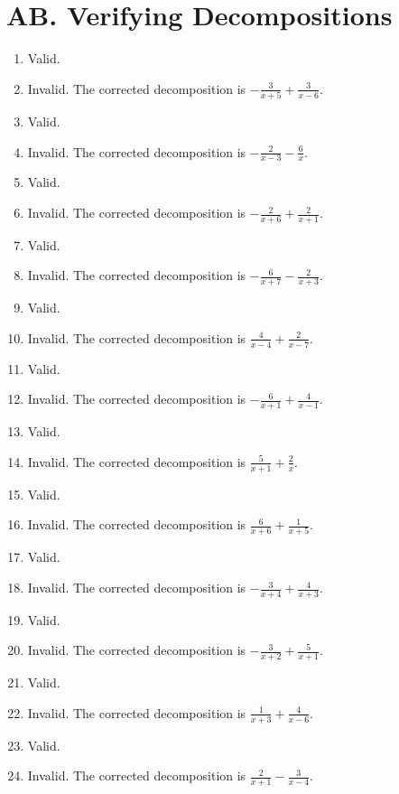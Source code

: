 \documentclass[11pt,oneside]{book}
\begin{document}
\section*{AB. Verifying Decompositions}
\begin{enumerate}[leftmargin=*,label=\textbf{AB\arabic*.},itemsep=0.45\baselineskip]
\item Valid.
\item Invalid. The corrected decomposition is $\displaystyle - \frac{3}{x + 5} + \frac{3}{x - 6}$.
\item Valid.
\item Invalid. The corrected decomposition is $\displaystyle - \frac{2}{x - 3} - \frac{6}{x}$.
\item Valid.
\item Invalid. The corrected decomposition is $\displaystyle - \frac{2}{x + 6} + \frac{2}{x + 1}$.
\item Valid.
\item Invalid. The corrected decomposition is $\displaystyle - \frac{6}{x + 7} - \frac{2}{x + 3}$.
\item Valid.
\item Invalid. The corrected decomposition is $\displaystyle \frac{4}{x - 4} + \frac{2}{x - 7}$.
\item Valid.
\item Invalid. The corrected decomposition is $\displaystyle - \frac{6}{x + 1} + \frac{4}{x - 1}$.
\item Valid.
\item Invalid. The corrected decomposition is $\displaystyle \frac{5}{x + 1} + \frac{2}{x}$.
\item Valid.
\item Invalid. The corrected decomposition is $\displaystyle \frac{6}{x + 6} + \frac{1}{x + 5}$.
\item Valid.
\item Invalid. The corrected decomposition is $\displaystyle - \frac{3}{x + 4} + \frac{4}{x + 3}$.
\item Valid.
\item Invalid. The corrected decomposition is $\displaystyle - \frac{3}{x + 2} + \frac{5}{x + 1}$.
\item Valid.
\item Invalid. The corrected decomposition is $\displaystyle \frac{1}{x + 3} + \frac{4}{x - 6}$.
\item Valid.
\item Invalid. The corrected decomposition is $\displaystyle \frac{2}{x + 1} - \frac{3}{x - 4}$.

\end{enumerate}
\end{document}
